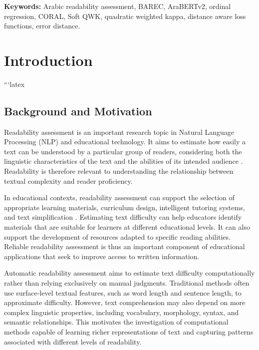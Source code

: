 \documentclass[12pt]{report}
\begin{document}
{\textbf{Keywords:}} Arabic readability assessment, BAREC, AraBERTv2, ordinal regression, CORAL, Soft QWK, quadratic weighted kappa, distance aware loss functions, error distance.




\tableofcontents


\chapter{Introduction}\label{chap:introduction}
```latex
\section{Background and Motivation}
\label{sec:background-motivation}

Readability assessment is an important research topic in Natural Language Processing (NLP) and educational technology. It aims to estimate how easily a text can be understood by a particular group of readers, considering both the linguistic characteristics of the text and the abilities of its intended audience \cite{dubay2004principles,vajjala2022trends}. Readability is therefore relevant to understanding the relationship between textual complexity and reader proficiency.

In educational contexts, readability assessment can support the selection of appropriate learning materials, curriculum design, intelligent tutoring systems, and text simplification \cite{vajjala2022trends}. Estimating text difficulty can help educators identify materials that are suitable for learners at different educational levels. It can also support the development of resources adapted to specific reading abilities. Reliable readability assessment is thus an important component of educational applications that seek to improve access to written information.

Automatic readability assessment aims to estimate text difficulty computationally rather than relying exclusively on manual judgments. Traditional methods often use surface-level textual features, such as word length and sentence length, to approximate difficulty. However, text comprehension may also depend on more complex linguistic properties, including vocabulary, morphology, syntax, and semantic relationships. This motivates the investigation of computational methods capable of learning richer representations of text and capturing patterns associated with different levels of readability.
\end{document}
